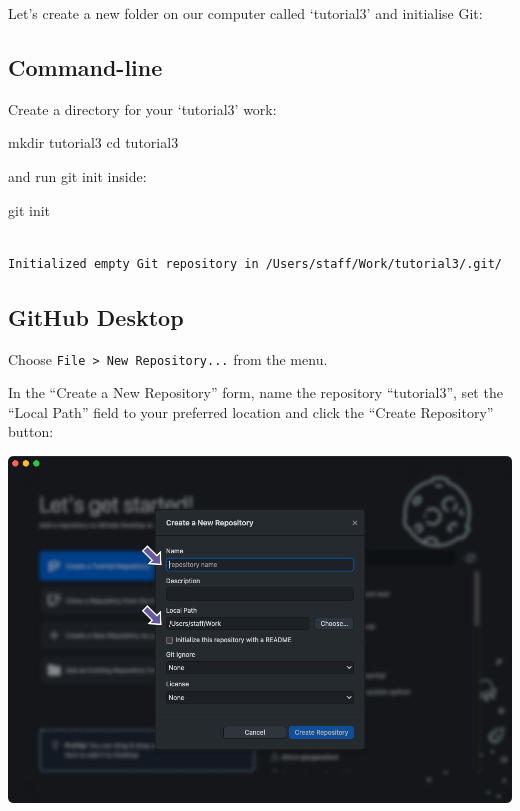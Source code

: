 \documentclass[
  letterpaper,
  DIV=11,
  numbers=noendperiod]{scrartcl}
\newenvironment{Shaded}{\begin{snugshade}}{\end{snugshade}}
\newcommand{\BuiltInTok}[1]{\textcolor[rgb]{0.00,0.23,0.31}{#1}}
\newcommand{\FunctionTok}[1]{\textcolor[rgb]{0.28,0.35,0.67}{#1}}
\newcommand{\NormalTok}[1]{\textcolor[rgb]{0.00,0.23,0.31}{#1}}
\begin{document}
Let's create a new folder on our computer called `tutorial3' and
initialise Git:

\subsection{Command-line}

Create a directory for your `tutorial3' work:

\begin{Shaded}
\begin{Highlighting}[]
\FunctionTok{mkdir}\NormalTok{ tutorial3}
\BuiltInTok{cd}\NormalTok{ tutorial3}
\end{Highlighting}
\end{Shaded}

and run git init inside:

\begin{Shaded}
\begin{Highlighting}[]
\FunctionTok{git}\NormalTok{ init}
\end{Highlighting}
\end{Shaded}

\begin{verbatim}

Initialized empty Git repository in /Users/staff/Work/tutorial3/.git/
\end{verbatim}

\subsection{GitHub Desktop}

Choose \texttt{File\ \textgreater{}\ New\ Repository...} from the menu.

In the ``Create a New Repository'' form, name the repository
``tutorial3'', set the ``Local Path'' field to your preferred location
and click the ``Create Repository'' button:

\includegraphics{images/image27.png}
\end{document}
